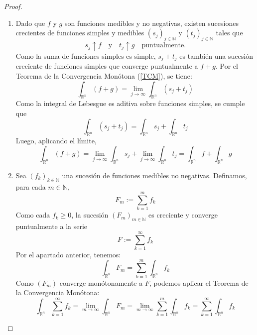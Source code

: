 \begin{proof}
    \leavevmode
    \begin{enumerate}
        \item Dado que $f$ y $g$ son funciones medibles y no negativas, existen sucesiones crecientes de funciones simples y medibles $(s_j)_{j \in \mathbb{N}}$ y $(t_j)_{j \in \mathbb{N}}$ tales que
        \[
            s_j \uparrow f \quad \text{y} \quad t_j \uparrow g \quad \text{puntualmente.}
        \]
        Como la suma de funciones simples es simple, $s_j + t_j$ es también una sucesión creciente de funciones simples que converge puntualmente a $f + g$. Por el Teorema de la Convergencia Monótona (\cref{TCM}), se tiene:
        \[
            \int_{\mathbb{R}^n} (f + g) = \lim_{j \to \infty} \int_{\mathbb{R}^n} (s_j + t_j)
        \]
        Como la integral de Lebesgue es aditiva sobre funciones simples, se cumple que
        \[
            \int_{\mathbb{R}^n} (s_j + t_j) = \int_{\mathbb{R}^n} s_j + \int_{\mathbb{R}^n} t_j
        \]
        Luego, aplicando el límite,
        \[
            \int_{\mathbb{R}^n} (f + g) = \lim_{j \to \infty} \int_{\mathbb{R}^n} s_j + \lim_{j \to \infty} \int_{\mathbb{R}^n} t_j = \int_{\mathbb{R}^n} f + \int_{\mathbb{R}^n} g
        \]

        \item Sea $(f_k)_{k \in \mathbb{N}}$ una sucesión de funciones medibles no negativas. Definamos, para cada $m \in \mathbb{N}$,
        \[
            F_m := \sum_{k = 1}^m f_k
        \]
        Como cada $f_k \geq 0$, la sucesión $(F_m)_{m \in \mathbb{N}}$ es creciente y converge puntualmente a la serie
        \[
            F := \sum_{k = 1}^{\infty} f_k
        \]
        Por el apartado anterior, tenemos:
        \[
            \int_{\mathbb{R}^n} F_m = \sum_{k = 1}^{m} \int_{\mathbb{R}^n} f_k
        \]
        Como $(F_m)$ converge monótonamente a $F$, podemos aplicar el Teorema de la Convergencia Monótona:
        \[
            \int_{\mathbb{R}^n} \sum_{k = 1}^{\infty} f_k = \lim_{m \to \infty} \int_{\mathbb{R}^n} F_m = \lim_{m \to \infty} \sum_{k = 1}^{m} \int_{\mathbb{R}^n} f_k = \sum_{k = 1}^{\infty} \int_{\mathbb{R}^n} f_k
        \]
    \end{enumerate}
\end{proof}


